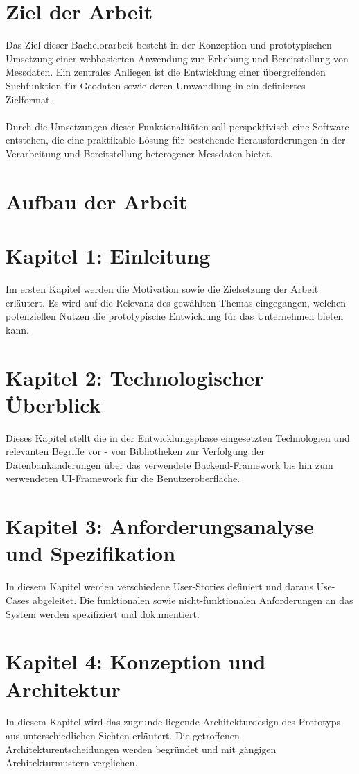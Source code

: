 \documentclass[a4paper,12pt]{scrreprt}
\begin{document}
	\section{Ziel der Arbeit}
	Das Ziel dieser Bachelorarbeit besteht in der Konzeption und prototypischen Umsetzung einer webbasierten Anwendung zur Erhebung und Bereitstellung von Messdaten. Ein zentrales Anliegen ist die Entwicklung einer übergreifenden Suchfunktion für Geodaten sowie deren Umwandlung in ein definiertes Zielformat. \\ \\ 
	Durch die Umsetzungen dieser Funktionalitäten soll perspektivisch eine Software entstehen, die eine praktikable Lösung für bestehende Herausforderungen in der Verarbeitung und Bereitstellung heterogener Messdaten bietet.
	\clearpage
	\section{Aufbau der Arbeit}
	\section*{\small \textbf{Kapitel 1: Einleitung}}
	Im ersten Kapitel werden die Motivation sowie die Zielsetzung der Arbeit erläutert. Es wird auf die Relevanz des gewählten Themas eingegangen, welchen potenziellen Nutzen die prototypische Entwicklung für das Unternehmen bieten kann.
	\section*{\small \textbf{Kapitel 2: Technologischer Überblick}}
	Dieses Kapitel stellt die in der Entwicklungsphase eingesetzten Technologien und relevanten Begriffe vor - von Bibliotheken zur Verfolgung der Datenbankänderungen über das verwendete Backend-Framework bis hin zum verwendeten UI-Framework für die Benutzeroberfläche.   
	\section*{\small \textbf{Kapitel 3: Anforderungsanalyse und Spezifikation}}
	In diesem Kapitel werden verschiedene User-Stories definiert und daraus Use-Cases abgeleitet. Die funktionalen sowie nicht-funktionalen Anforderungen an das System werden spezifiziert und dokumentiert.
	\section*{\small \textbf{Kapitel 4: Konzeption und Architektur}}
	In diesem Kapitel wird das zugrunde liegende Architekturdesign des Prototyps aus unterschiedlichen Sichten erläutert. Die getroffenen Architekturentscheidungen werden begründet und mit gängigen Architekturmustern verglichen.
\end{document}
